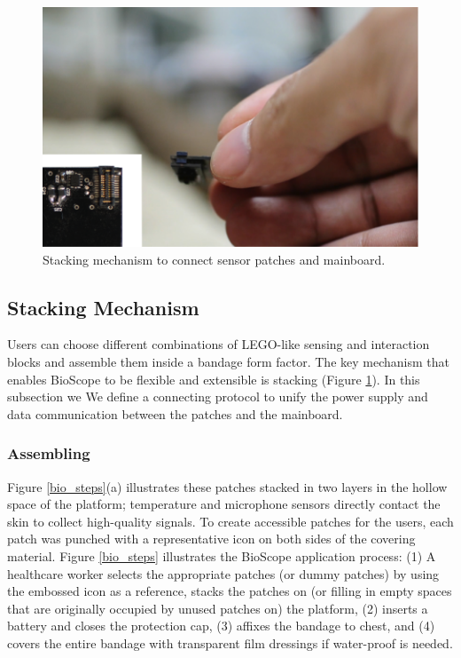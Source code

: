 \begin{figure}
\centering
\includegraphics[width=15cm]{image/bio_stack}
\caption{Stacking mechanism to connect sensor patches and mainboard.}
\label{bio_stack}
\end{figure}

\subsection{Stacking Mechanism}
Users can choose different combinations of LEGO-like sensing and interaction blocks and assemble them inside a bandage form factor. The key mechanism that enables BioScope to be flexible and extensible is stacking (Figure \ref{bio_stack}). In this subsection we We define a connecting protocol to unify the power supply and data communication between the patches and the mainboard. 

\vspace{15pt}
\subsubsection{Assembling}
Figure \ref{bio_steps}(a) illustrates these patches stacked in two layers in the hollow space of the platform; temperature and microphone sensors directly contact the skin to collect high-quality signals. 
To create accessible patches for the users, each patch was punched with a representative icon on both sides of the covering material. Figure \ref{bio_steps} illustrates the BioScope application process: (1) A healthcare worker selects the appropriate patches (or dummy patches) by using the embossed icon as a reference, stacks the patches on (or filling in empty spaces that are originally occupied by unused patches on) the platform, (2) inserts a battery and closes the protection cap, (3) affixes the bandage to chest, and (4) covers the entire bandage with transparent film dressings if water-proof is needed.


